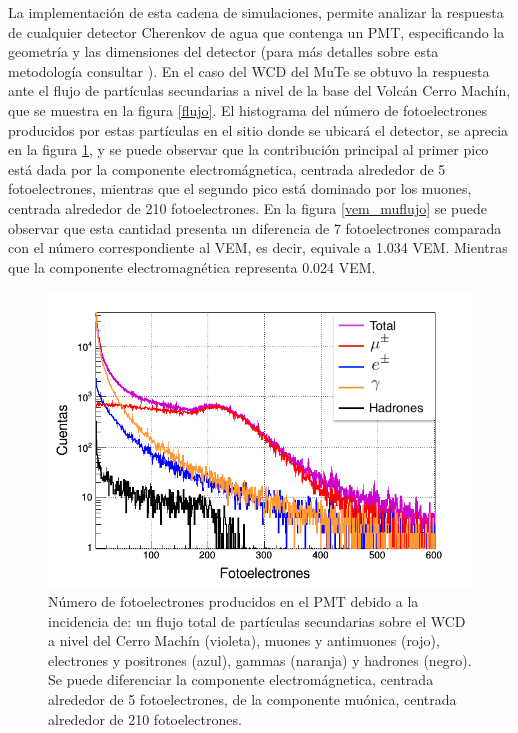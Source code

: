 \documentclass[12pt,oneside,openany,letter]{book}
\begin{document}
La implementaci\'on de esta cadena de simulaciones, permite analizar la respuesta de cualquier detector Cherenkov de agua que contenga un PMT, especificando la geometr\'ia y las dimensiones del detector (para m\'as detalles sobre esta metodolog\'ia consultar \cite{JaimesMotta2018}). En el caso del WCD del MuTe se obtuvo la respuesta ante el flujo de partículas secundarias a nivel de la base del Volc\'an Cerro Mach\'in, que se muestra en la figura \ref{flujo}. El histograma del número de fotoelectrones producidos por estas partículas en el sitio donde se ubicará el detector, se aprecia en la figura \ref{fotoelec_flujo}, y se puede observar que la contribución principal al primer pico está dada por la componente electromágnetica, centrada alrededor de 5 fotoelectrones, mientras que el segundo pico está dominado por los muones, centrada alrededor de 210 fotoelectrones. En la figura \ref{vem_muflujo} se puede observar que esta cantidad presenta un diferencia de 7 fotoelectrones comparada con el n\'umero correspondiente al VEM, es decir, equivale a 1.034 VEM. Mientras que la componente electromagn\'etica representa 0.024 VEM.



\begin{figure}[h]
\centering
\includegraphics[scale=0.4]{fotoelec_flujo.png}
\caption[Número de fotoelectrones producidos debido a la incidencia del flujo total de partículas secundarias sobre el WCD a nivel del Cerro Machín]{Número de fotoelectrones producidos en el PMT debido a la incidencia de: un flujo total de partículas secundarias sobre el WCD a nivel del Cerro Machín (violeta), muones y antimuones (rojo), electrones y positrones (azul), gammas (naranja) y hadrones (negro). Se puede diferenciar la componente electromágnetica, centrada alrededor de 5 fotoelectrones, de la componente muónica, centrada alrededor de 210 fotoelectrones. 
\label{fotoelec_flujo}}
\end{figure}
\end{document}
